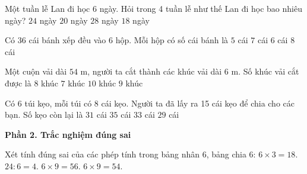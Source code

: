 \begin{ex} %
Một tuần lễ Lan đi học 6 ngày. Hỏi trong 4 tuần lễ như thế Lan đi học bao nhiêu ngày?
\choice
{\True $24$ ngày}
{$20$ ngày}
{$28$ ngày}
{$18$ ngày}
\end{ex}

\begin{ex} %
Có 36 cái bánh xếp đều vào 6 hộp. Mỗi hộp có số cái bánh là
\choice
{$5$ cái}
{$7$ cái}
{\True $6$ cái}
{$8$ cái}
\end{ex}

\begin{ex} %
Một cuộn vải dài $54\text{ m}$, người ta cắt thành các khúc vải dài $6\text{ m}$. Số khúc vải cắt được là
\choice
{$8$ khúc}
{$7$ khúc}
{$10$ khúc}
{\True $9$ khúc}
\end{ex}

\begin{ex} %
Có 6 túi kẹo, mỗi túi có 8 cái kẹo. Người ta đã lấy ra 15 cái kẹo để chia cho các bạn. Số kẹo còn lại là
\choice
{$31$ cái}
{$35$ cái}
{\True $33$ cái}
{$29$ cái}
\end{ex}

\textbf{Phần 2. Trắc nghiệm đúng sai}

\begin{ex} %
Xét tính đúng sai của các phép tính trong bảng nhân 6, bảng chia 6:
\choiceTF
{\True $6 \times 3 = 18$.}
{\True $24 : 6 = 4$.}
{$6 \times 9 = 56$.}
{\True $6 \times 9 = 54$.}
\end{ex}

